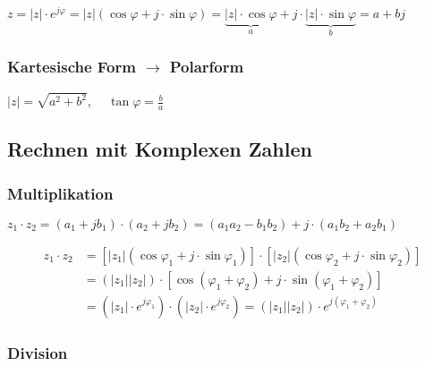 			
				\( z = \left| z \right| \cdot e^{j \varphi} = \left| z \right| \left( \cos \varphi + j \cdot \sin \varphi \right) = 
				\underbrace{\left| z \right| \cdot \cos \varphi}_{a} + j \cdot \underbrace{\left| z \right| \cdot \sin \varphi}_{b} = a + bj \)	
			
			\vspace{10mm}
			\subsubsection{Kartesische Form \(\rightarrow\) Polarform}
			
			
				\( \left| z \right| = \sqrt{a^2 + b^2}\), \ \ \(\tan \varphi = \frac{b}{a} \)
				
		\vspace{10mm}
		\subsection{Rechnen mit Komplexen Zahlen}
		
			\vspace{10mm}
			\subsubsection{Multiplikation}
								
				
								
				\begin{center}
				\(z_1 \cdot z_2 = \left( a_1 + j b_1 \right) \cdot \left( a_2 + j b_2 \right) 
												= \left( a_1 a_2 - b_1 b_2 \right) + j \cdot \left( a_1 b_2 + a_2 b_1 \right)\)
				\end{center}
								
												
				\begin{align*}
					z_1 \cdot z_2 &= \left[ \left| z_1 \right| \left( \cos \varphi_1 + j \cdot \sin \varphi_1 \right) \right] \cdot 
													 \left[ \left| z_2 \right| \left( \cos \varphi_2 + j \cdot \sin \varphi_2 \right) \right]
					\\
					&= \left( \left| z_1 \right| \left| z_2 \right| \right) \cdot \left[ \cos \left( \varphi_1 + \varphi_2 \right) +  
					j \cdot \sin \left(	\varphi_1 + \varphi_2 \right) \right]
					\\
					&= \left( \left| z_1 \right| \cdot e^{j \varphi_1} \right) \cdot \left( \left| z_2 \right| \cdot e^{j \varphi_2} \right)
					= \left( \left| z_1 \right| \left| z_2 \right| \right) \cdot e^{j \left( \varphi_1 + \varphi_2 \right)}
				\end{align*}
			
			\vspace{10mm}	
			\subsubsection{Division}
			
				
					\begin{center}
						
					\end{center}
				
